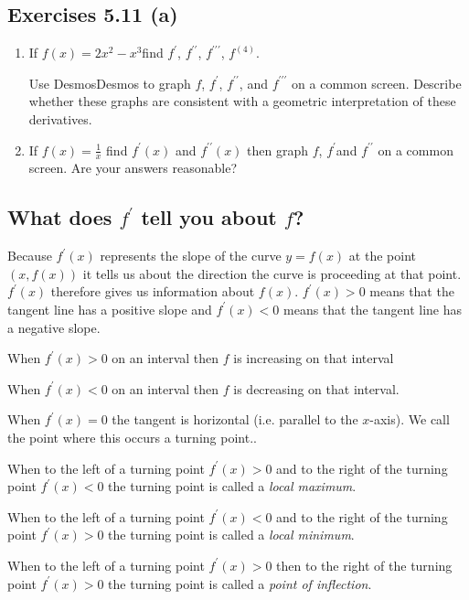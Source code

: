 \subsection{Exercises 5.11 (a)}
\begin{enumerate}
\item If $f (x) =2 x^{2} -x^{3}$find $f^{ \prime }$, $f^{ \prime  \prime }$, $f^{ \prime  \prime  \prime }$, $f^{(4)}$. 

Use DesmosDesmos to graph $f$, $f^{ \prime }$, $f^{ \prime  \prime }$, and $f^{ \prime  \prime  \prime }$ on a common screen. Describe whether these graphs are consistent with a geometric interpretation
of these derivatives. 

\item If $f (x) =\frac{1}{x}$ find $f^{ \prime } (x)$ and $f^{ \prime  \prime } (x)$ then graph $f$, $f^{ \prime }$and $f^{ \prime  \prime }$ on a common screen. Are your answers reasonable? \end{enumerate}


\subsection{What does $f^{ \prime }$ tell you about $f$?}
Because $f^{ \prime } (x)$ represents the slope of the curve $y =f (x)$ at the point $\left (x ,f \left (x\right )\right )$ it tells us about the direction the curve is proceeding at that
point. $f^{ \prime } (x)$ therefore gives us information about $f (x)$. $f^{ \prime } (x) >0$ means that the tangent line has a positive slope and $f^{ \prime } (x) <0$ means that the tangent line has a negative slope. 

When $f^{ \prime } (x) >0$ on an interval then $f$ is increasing on that interval 

When $f^{ \prime } (x) <0$ on an interval then $f$ is decreasing on that interval. 

When $f^{ \prime } (x) =0$ the tangent is horizontal (i.e. parallel to the $x$-axis). We call the point where this occurs a turning point.. 

When
to the left of a turning point $f^{ \prime } (x) >0$ and to the right of the turning point $f^{ \prime } (x) <0$ the turning point is called a \emph{local maximum}. 

When to the left of a turning point
$f^{ \prime } (x) <0$ and to the right of the turning point $f^{ \prime } (x) >0$ the turning point is called a \emph{local minimum}. 

When to the left of a turning point
$f^{ \prime } (x) >0$ then to the right of the turning point $f^{ \prime } (x) >0$ the turning point is called a \emph{point of inflection}. 

